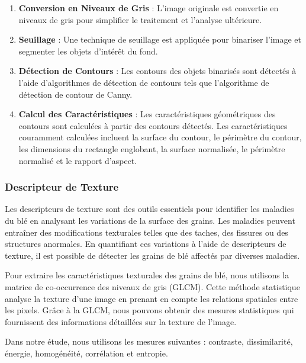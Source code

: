 \begin{enumerate}
	\item \textbf{Conversion en Niveaux de Gris} : L'image originale est convertie en niveaux de gris pour simplifier le traitement et l'analyse ultérieure.
	
	\item \textbf{Seuillage} : Une technique de seuillage est appliquée pour binariser l'image et segmenter les objets d'intérêt du fond.
	
	\item \textbf{Détection de Contours} : Les contours des objets binarisés sont détectés à l'aide d'algorithmes de détection de contours tels que l'algorithme de détection de contour de Canny.
	
	\item \textbf{Calcul des Caractéristiques} : Les caractéristiques géométriques des contours sont calculées à partir des contours détectés. Les caractéristiques couramment calculées incluent la surface du contour, le périmètre du contour, les dimensions du rectangle englobant, la surface normalisée, le périmètre normalisé et le rapport d'aspect.
\end{enumerate}

\subsubsection{Descripteur de Texture}
Les descripteurs de texture sont des outils essentiels pour identifier les maladies du blé en analysant les variations de la surface des grains. Les maladies peuvent entraîner des modifications texturales telles que des taches, des fissures ou des structures anormales. En quantifiant ces variations à l'aide de descripteurs de texture, il est possible de détecter les grains de blé affectés par diverses maladies.

Pour extraire les caractéristiques texturales des grains de blé, nous utilisons la matrice de co-occurrence des niveaux de gris (GLCM). Cette méthode statistique analyse la texture d'une image en prenant en compte les relations spatiales entre les pixels. Grâce à la GLCM, nous pouvons obtenir des mesures statistiques qui fournissent des informations détaillées sur la texture de l'image.

Dans notre étude, nous utilisons les mesures suivantes : contraste, dissimilarité, énergie, homogénéité, corrélation et entropie.

